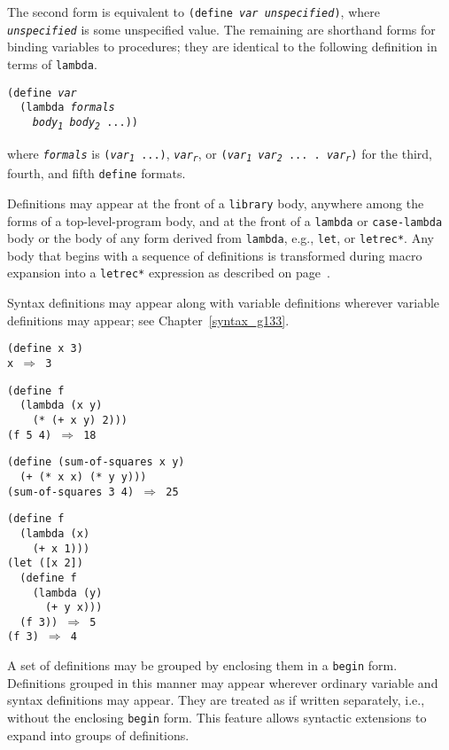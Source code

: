 The second form is equivalent to \texttt{(define \textit{var} \textit{unspecified})},
where \texttt{\textit{unspecified}} is some unspecified value.
\label{binding_s25}The remaining are shorthand forms for
binding variables to
procedures; they are identical to the following definition in terms of
\texttt{lambda}.


\begin{alltt}
(define \textit{var}
  (lambda \textit{formals}
    \textit{body\textsubscript{1}} \textit{body\textsubscript{2}} ...))
\end{alltt}


where \texttt{\textit{formals}} is \texttt{(\textit{var\textsubscript{1}} ...)}, \texttt{\textit{var\textsubscript{r}}},
or \texttt{(\textit{var\textsubscript{1}} \textit{var\textsubscript{2}} ... . \textit{var\textsubscript{r}})} for the third,
fourth, and fifth \texttt{define} formats.


Definitions may appear at the front of a \texttt{library} body, anywhere
among the forms of a top-level-program body, and at the front of a
\texttt{lambda} or \texttt{case-lambda} body or the body of any form
derived from \texttt{lambda}, e.g., \texttt{let}, or \texttt{letrec*}.
Any body that begins with a sequence of definitions is transformed
during macro expansion into a \texttt{letrec*} expression as described
on page \pageref{syntax_body_expansion}.


Syntax definitions may appear along with variable definitions wherever
variable definitions may appear; see Chapter \ref{syntax_g133}.


\begin{alltt}
(define x 3)
x \(\Rightarrow\) 3

(define f
  (lambda (x y)
    (* (+ x y) 2)))
(f 5 4) \(\Rightarrow\) 18

(define (sum-of-squares x y)
  (+ (* x x) (* y y)))
(sum-of-squares 3 4) \(\Rightarrow\) 25

(define f
  (lambda (x)
    (+ x 1)))
(let ([x 2])
  (define f
    (lambda (y)
      (+ y x)))
  (f 3)) \(\Rightarrow\) 5
(f 3) \(\Rightarrow\) 4
\end{alltt}


A set of definitions may be grouped by enclosing them in a
\label{binding_s26}\texttt{begin} form.
Definitions grouped in this manner may appear wherever ordinary
variable and syntax definitions may appear.
They are treated as if written separately, i.e., without the
enclosing \texttt{begin} form.
\label{binding_multi_define_syntax}This feature allows syntactic extensions to
expand into groups of definitions.



